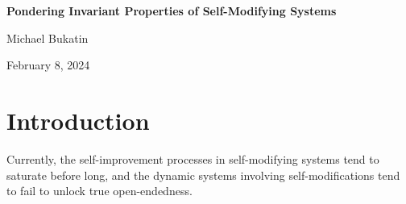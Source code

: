 \documentclass{article}
\begin{document}
\renewcommand{\abstractname}{\vspace{-\baselineskip}}

\renewcommand\contentsname{\vspace{-\baselineskip}}


\begin{center}

{\bf Pondering Invariant Properties of Self-Modifying Systems}
                                   



\vspace{0.1in}
Michael Bukatin


\vspace{0.085in}
February 8, 2024
\end{center}



\begin{abstract}
The studies of invariant properties of self-modifying systems is a subject which is
quite neglected and which is likely to become fairly important in the near future.

It is likely that the ability to establish at least some approximately invariant
properties of self-modifying systems will be important for any hopes
to maintain any specific safety properties of the rapidly evolving AI ecosystem
and of the world containing this ecosystem.

One conjecture I would like to ponder is that it is likely to
be easier to maintain invariants in a situation where changes are
gradual and continuous (especially, if the self-modifying ecosystem
can control the rate at which the potentially most disruptive changes are phased in).

Let's ponder some possible technical directions which might allow us to make progress here.

\end{abstract}

\section{Introduction}

Currently, the self-improvement processes in self-modifying systems tend to saturate before long,
and the dynamic systems involving self-modifications tend to fail to unlock true open-endedness.
\end{document}
